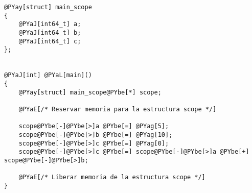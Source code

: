 \begin{Verbatim}[commandchars=@\[\]]
@PYay[struct] main_scope
{
    @PYaJ[int64_t] a;
    @PYaJ[int64_t] b;
    @PYaJ[int64_t] c;
};


@PYaJ[int] @PYaL[main]()
{
    @PYay[struct] main_scope@PYbe[*] scope;
    
    @PYaE[/* Reservar memoria para la estructura scope */]

    scope@PYbe[-]@PYbe[>]a @PYbe[=] @PYag[5];
    scope@PYbe[-]@PYbe[>]b @PYbe[=] @PYag[10];
    scope@PYbe[-]@PYbe[>]c @PYbe[=] @PYag[0];
    scope@PYbe[-]@PYbe[>]c @PYbe[=] scope@PYbe[-]@PYbe[>]a @PYbe[+] scope@PYbe[-]@PYbe[>]b;

    @PYaE[/* Liberar memoria de la estructura scope */]
}
\end{Verbatim}
